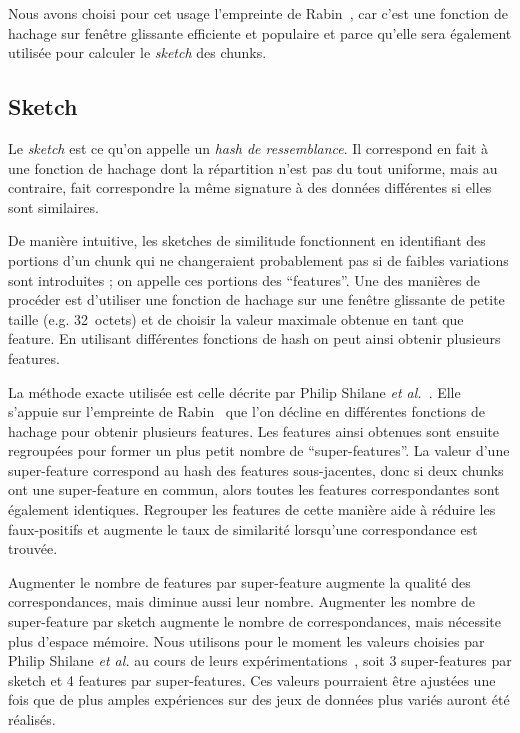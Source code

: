 \documentclass[a4paper]{report}
\makeatletter
\newcommand{\etal}{\emph{et al.}\@\xspace}
\makeatother
\begin{document}
Nous avons choisi pour cet usage l'empreinte de Rabin~\cite{rabin1981fingerprinting}, car c'est une fonction de hachage sur fenêtre glissante efficiente et populaire et parce qu'elle sera également utilisée pour calculer le \emph{sketch} des chunks.

\subsection{Sketch}

Le \emph{sketch} est ce qu'on appelle un \emph{hash de ressemblance}.
Il correspond en fait à une fonction de hachage dont la répartition n'est pas du tout uniforme,
mais au contraire, fait correspondre la même signature à des données différentes si elles sont similaires.

De manière intuitive, les sketches de similitude fonctionnent en identifiant des portions d'un chunk
qui ne changeraient probablement pas si de faibles variations sont introduites ;
on appelle ces portions des ``features''.
Une des manières de procéder est d'utiliser une fonction de hachage sur une fenêtre glissante de petite taille
(e.g. 32~octets) et de choisir la valeur maximale obtenue en tant que feature.
En utilisant différentes fonctions de hash on peut ainsi obtenir plusieurs features.

La méthode exacte utilisée est celle décrite par Philip Shilane \etal~\cite{shilane2012wan}.
Elle s'appuie sur l'empreinte de Rabin~\cite{rabin1981fingerprinting} que l'on décline en différentes fonctions de hachage pour obtenir plusieurs features.
Les features ainsi obtenues sont ensuite regroupées pour former un plus petit nombre de ``super-features''.
La valeur d'une super-feature correspond au hash des features sous-jacentes,
donc si deux chunks ont une super-feature en commun, alors toutes les features correspondantes sont également identiques.
Regrouper les features de cette manière aide à réduire les faux-positifs et augmente le taux de similarité lorsqu'une correspondance est trouvée.

Augmenter le nombre de features par super-feature augmente la qualité des correspondances, mais diminue aussi leur nombre.
Augmenter les nombre de super-feature par sketch augmente le nombre de correspondances, mais nécessite plus d'espace mémoire.
Nous utilisons pour le moment les valeurs choisies par Philip Shilane \etal au cours de leurs expérimentations~\cite{shilane2012wan},
soit 3 super-features par sketch et 4 features par super-features.
Ces valeurs pourraient être ajustées une fois que de plus amples expériences sur des jeux de données plus variés auront été réalisés.
\end{document}
